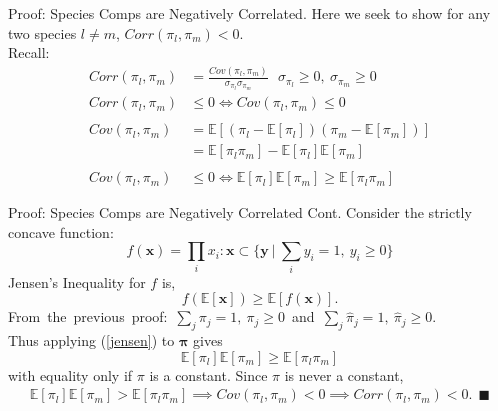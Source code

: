 \documentclass[ xcolor = pdftex, dvipsnames, table ]{beamer}
\begin{document}
%
\begin{frame}{Proof: Species Comps are Negatively Correlated.}
	Here we seek to show for any two species $l\neq m$, $Corr(\pi_{l}, \pi_{m})<0$.\\
	Recall:
	\begin{align*}
		Corr(\pi_{l}, \pi_{m}) &= \frac{Cov(\pi_{l}, \pi_{m})}{\sigma_{\pi_{l}}\sigma_{\pi_{m}}} ~~~ \sigma_{\pi_{l}}\ge0,~ \sigma_{\pi_{m}}\ge0 \nonumber\\
		Corr(\pi_{l}, \pi_{m}) &\le 0 \iff Cov(\pi_{l}, \pi_{m}) \le 0 \nonumber\\\nonumber\\
		Cov(\pi_{l}, \pi_{m}) &= \mathbb{E}[(\pi_{l}-\mathbb{E}[\pi_{l}])(\pi_{m}-\mathbb{E}[\pi_{m}])] \nonumber\\ 
		&= \mathbb{E}[\pi_{l}\pi_{m}] - \mathbb{E}[\pi_{l}]\mathbb{E}[\pi_{m}] \nonumber\\\nonumber\\
		Cov(\pi_{l}, \pi_{m}) &\le0 \iff \mathbb{E}[\pi_{l}]\mathbb{E}[\pi_{m}] \ge \mathbb{E}[\pi_{l}\pi_{m}]
	\end{align*}
\end{frame}

%
%

%
\begin{frame}{Proof: Species Comps are Negatively Correlated Cont.}
	Consider the strictly concave function:
	\begin{equation*}
		 f(\bm{x})=\textstyle{\prod_i} x_i : \bm{x}\subset\Big\{\bm{y}~|~\textstyle{\sum_i} y_i = 1,~y_i \ge 0\Big\} 
	\end{equation*}  	
	Jensen's Inequality for $f$ is,
	\begin{equation}
		f(\mathbb{E}[\bm{x}]) \ge \mathbb{E}[f(\bm{x})].
		\label{jensen}
	\end{equation}
	\mbox{From the previous proof: $\sum_j \pi_{j} = 1,~\pi_j \ge 0$ and $\sum_j \hat\pi_{j} = 1,~\hat\pi_j \ge 0$.}\\
        Thus applying (\ref{jensen}) to $\bm{\pi}$ gives  
	\begin{equation}
		\mathbb{E}[\pi_{l}]\mathbb{E}[\pi_{m}] \ge \mathbb{E}[\pi_{l}\pi_{m}]
	\end{equation}
	with equality only if $\pi$ is a constant. Since $\pi$ is never a constant, 
	\begin{align*}
		\mathbb{E}[\pi_{l}]\mathbb{E}[\pi_{m}] > \mathbb{E}[\pi_{l}\pi_{m}] \implies Cov(\pi_{l}, \pi_{m})<0 \implies Corr(\pi_{l}, \pi_{m})<0. ~~\blacksquare
	\end{align*} 
\end{frame}

%
\end{document}
